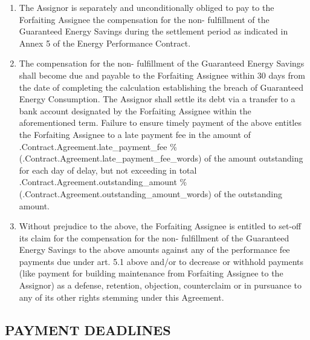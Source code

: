\documentclass[a4paper]{article}
\begin{document}
\begin{enumerate}
\item{The Assignor is separately and unconditionally obliged to pay to
    the Forfaiting Assignee the compensation for the non{-}
    fulfillment of the Guaranteed Energy Savings during the settlement
    period as indicated in Annex 5 of the Energy Performance
    Contract.}

\item{The compensation for the non{-} fulfillment of the Guaranteed
    Energy Savings shall become due and payable to the Forfaiting
    Assignee within 30 days from the date of completing the
    calculation establishing the breach of Guaranteed Energy
    Consumption. The Assignor shall settle its debt via a transfer to
    a bank account designated by the Forfaiting Assignee within the
    aforementioned term. Failure to ensure timely payment of the above
    entitles the Forfaiting Assignee to a late payment fee in the
    amount of \iffalse input forfaitingFields.late_payment_fee value="{{.Contract.Agreement.late_payment_fee}}" type="number" \fi {{.Contract.Agreement.late_payment_fee}} \%
    (\iffalse input forfaitingFields.late_payment_fee_words value="{{.Contract.Agreement.late_payment_fee_words}}" \fi {{.Contract.Agreement.late_payment_fee_words}}) of the amount
    outstanding for each day of delay, but not exceeding in total \iffalse input forfaitingFields.outstanding_amount value="{{.Contract.Agreement.outstanding_amount}}" type="number" \fi {{.Contract.Agreement.outstanding_amount}}
    \%(\iffalse input forfaitingFields.outstanding_amount_words value="{{.Contract.Agreement.outstanding_amount_words}}" \fi {{.Contract.Agreement.outstanding_amount_words}}) of the outstanding amount.}

\item{Without prejudice to the above, the Forfaiting Assignee is
    entitled to set{-}off its claim for the compensation for the
    non{-} fulfillment of the Guaranteed Energy Savings to the above
    amounts against any of the performance fee payments due under
    art. 5.1 above and/or to decrease or withhold payments (like
    payment for building maintenance from Forfaiting Assignee to the
    Assignor) as a defense, retention, objection, counterclaim or in
    pursuance to any of its other rights stemming under this
    Agreement.}
\end{enumerate}

\subsection{PAYMENT DEADLINES}
\end{document}
